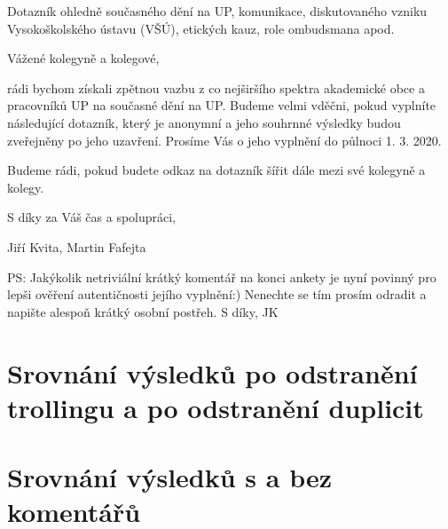 \documentclass[a4paper,twoside]{article}
\begin{document}
\bigskip
\noindent Dotazník ohledně současného dění na UP, komunikace, diskutovaného vzniku Vysokoškolského ústavu (VŠÚ), etických kauz, role ombudsmana apod.

\bigskip
Vážené kolegyně a kolegové,

\bigskip
rádi bychom získali zpětnou vazbu z co nejširšího spektra akademické obce a pracovníků UP na současné dění na UP. Budeme velmi vděčni, pokud vyplníte následující dotazník, který je anonymní a jeho souhrnné výsledky budou zveřejněny po jeho uzavření. Prosíme Vás o jeho vyplnění do půlnoci 1. 3. 2020.

\bigskip
Budeme rádi, pokud budete odkaz na dotazník šířit dále mezi své kolegyně a kolegy.

\bigskip
S díky za Váš čas a spolupráci,

\bigskip
Jiří Kvita, Martin Fafejta

\bigskip
PS: Jakýkolik netriviální krátký komentář na konci ankety je nyní povinný pro lepši ověření autentičnosti jejího vyplnění:) Nenechte se tím prosím odradit a napište alespoň krátký osobní postřeh. S díky, JK

\newpage
\section{Srovnání výsledků po odstranění trollingu a po odstranění duplicit}
\label{sec:trolling}



\newpage
\section{Srovnání výsledků s a bez komentářů}
\label{sec:comments}

\end{document}
